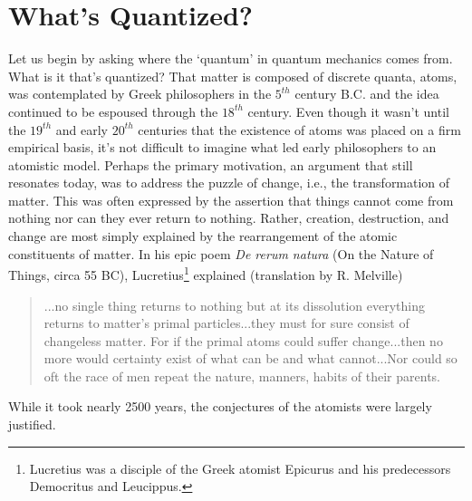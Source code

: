 \documentclass[12pt]{article}
\begin{document}
\section{What's Quantized?}
Let us begin by asking where the `quantum' in quantum mechanics comes from.  What is it that's quantized?  That matter is composed of discrete quanta, atoms, was contemplated by Greek philosophers in the $5^{th}$ century B.C.\cite{Be2011} and the idea continued to be espoused through the $18^{th}$ century.  Even though it wasn't until the $19^{th}$ and early $20^{th}$ centuries that the existence of atoms was placed on a firm empirical basis, it's not difficult to imagine what led early philosophers to an atomistic model.  Perhaps the primary motivation, an argument that still resonates today, was to address the puzzle of change, i.e., the transformation of matter.  This was often expressed by the assertion that things cannot come from nothing nor can they ever return to nothing.  Rather, creation, destruction, and change are most simply explained by the rearrangement of the atomic constituents of matter. In his epic poem {\it De rerum natura} (On the Nature of Things, circa 55 BC), Lucretius\footnote{Lucretius was a disciple of the Greek atomist Epicurus and his predecessors Democritus and Leucippus\cite{Be2011}.} explained (translation by R. Melville\cite{Lu55})
\begin{quote}
...no single thing returns to nothing but at its dissolution everything returns to matter's primal particles...they must for sure consist of changeless matter. For if the primal atoms could suffer change...then no more would certainty exist of what can be and what cannot...Nor could so oft the race of men repeat the nature, manners, habits of their parents.
\end{quote}
While it took nearly 2500 years, the conjectures of the atomists were largely justified.
\end{document}
